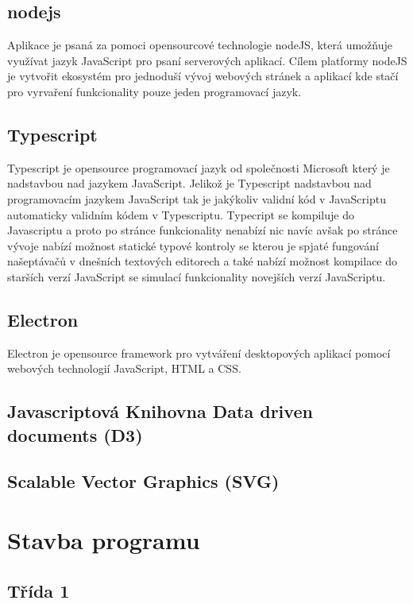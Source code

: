 \documentclass[
  biblatex,
  glossaries,
  index
]{kidiplom}
\begin{document}
\subsection{nodejs}
Aplikace je psaná za pomoci opensourcové technologie nodeJS, která umožňuje využívat jazyk 
JavaScript pro psaní serverových aplikací. Cílem platformy nodeJS je vytvořit
ekosystém pro jednoduší vývoj webových stránek a aplikací kde stačí pro vyrvaření 
funkcionality pouze jeden programovací jazyk.

\subsection{Typescript}
Typescript je opensource programovací jazyk od společnosti Microsoft který je nadstavbou nad jazykem JavaScript.
Jelikož je Typescript nadstavbou nad programovacím jazykem JavaScript tak je jakýkoliv validní kód v JavaScriptu automaticky validním kódem v Typescriptu.
Typecript se kompiluje do Javascriptu a proto po stránce funkcionality nenabízí nic navíc avšak po stránce vývoje nabízí možnost statické typové kontroly 
se kterou je spjaté fungování našeptávačů v dnešních textových editorech a také nabízí možnost kompilace do starších verzí JavaScript se simulací funkcionality novejších verzí JavaScriptu.


\subsection{Electron}
Electron je opensource framework pro vytváření desktopových aplikací pomocí webových technologií JavaScript, HTML a CSS.


\subsection{Javascriptová Knihovna Data driven documents (D3)}

\subsection{Scalable Vector Graphics (SVG)}




\section{Stavba programu}

\subsection{Třída 1}
\end{document}
